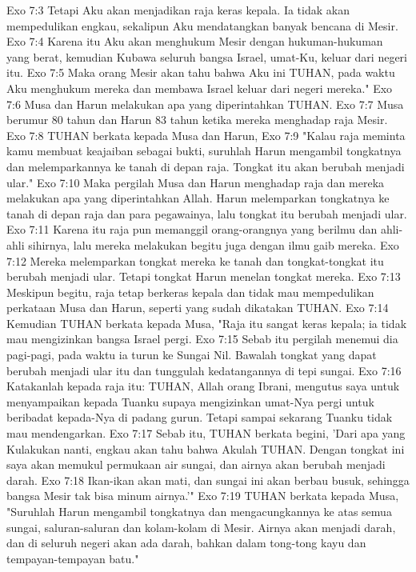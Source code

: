 Exo 7:3  Tetapi Aku akan menjadikan raja keras kepala. Ia tidak akan mempedulikan engkau, sekalipun Aku mendatangkan banyak bencana di Mesir.
Exo 7:4  Karena itu Aku akan menghukum Mesir dengan hukuman-hukuman yang berat, kemudian Kubawa seluruh bangsa Israel, umat-Ku, keluar dari negeri itu.
Exo 7:5  Maka orang Mesir akan tahu bahwa Aku ini TUHAN, pada waktu Aku menghukum mereka dan membawa Israel keluar dari negeri mereka."
Exo 7:6  Musa dan Harun melakukan apa yang diperintahkan TUHAN.
Exo 7:7  Musa berumur 80 tahun dan Harun 83 tahun ketika mereka menghadap raja Mesir.
Exo 7:8  TUHAN berkata kepada Musa dan Harun,
Exo 7:9  "Kalau raja meminta kamu membuat keajaiban sebagai bukti, suruhlah Harun mengambil tongkatnya dan melemparkannya ke tanah di depan raja. Tongkat itu akan berubah menjadi ular."
Exo 7:10  Maka pergilah Musa dan Harun menghadap raja dan mereka melakukan apa yang diperintahkan Allah. Harun melemparkan tongkatnya ke tanah di depan raja dan para pegawainya, lalu tongkat itu berubah menjadi ular.
Exo 7:11  Karena itu raja pun memanggil orang-orangnya yang berilmu dan ahli-ahli sihirnya, lalu mereka melakukan begitu juga dengan ilmu gaib mereka.
Exo 7:12  Mereka melemparkan tongkat mereka ke tanah dan tongkat-tongkat itu berubah menjadi ular. Tetapi tongkat Harun menelan tongkat mereka.
Exo 7:13  Meskipun begitu, raja tetap berkeras kepala dan tidak mau mempedulikan perkataan Musa dan Harun, seperti yang sudah dikatakan TUHAN.
Exo 7:14  Kemudian TUHAN berkata kepada Musa, "Raja itu sangat keras kepala; ia tidak mau mengizinkan bangsa Israel pergi.
Exo 7:15  Sebab itu pergilah menemui dia pagi-pagi, pada waktu ia turun ke Sungai Nil. Bawalah tongkat yang dapat berubah menjadi ular itu dan tunggulah kedatangannya di tepi sungai.
Exo 7:16  Katakanlah kepada raja itu: TUHAN, Allah orang Ibrani, mengutus saya untuk menyampaikan kepada Tuanku supaya mengizinkan umat-Nya pergi untuk beribadat kepada-Nya di padang gurun. Tetapi sampai sekarang Tuanku tidak mau mendengarkan.
Exo 7:17  Sebab itu, TUHAN berkata begini, 'Dari apa yang Kulakukan nanti, engkau akan tahu bahwa Akulah TUHAN. Dengan tongkat ini saya akan memukul permukaan air sungai, dan airnya akan berubah menjadi darah.
Exo 7:18  Ikan-ikan akan mati, dan sungai ini akan berbau busuk, sehingga bangsa Mesir tak bisa minum airnya.'"
Exo 7:19  TUHAN berkata kepada Musa, "Suruhlah Harun mengambil tongkatnya dan mengacungkannya ke atas semua sungai, saluran-saluran dan kolam-kolam di Mesir. Airnya akan menjadi darah, dan di seluruh negeri akan ada darah, bahkan dalam tong-tong kayu dan tempayan-tempayan batu."
